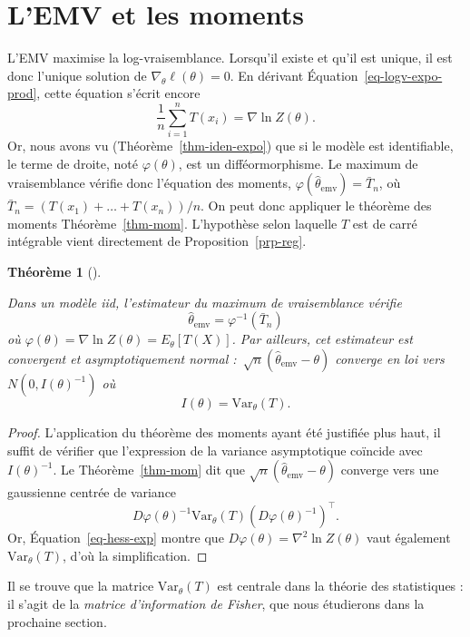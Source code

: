 \documentclass[
  10,
  letterpaper,
  DIV=11,
  numbers=noendperiod]{scrreport}
\newcommand{\emv}{\hat{\theta}_{\mathrm{emv}}}
\theoremstyle{plain}
\newtheorem{theorem}{Théorème}[chapter]
\theoremstyle{definition}
\theoremstyle{plain}
\theoremstyle{definition}
\theoremstyle{definition}
\theoremstyle{plain}
\theoremstyle{remark}
\begin{document}
\hypertarget{lemv-et-les-moments}{%
\section{L'EMV et les moments}\label{lemv-et-les-moments}}

L'EMV maximise la log-vraisemblance. Lorsqu'il existe et qu'il est
unique, il est donc l'unique solution de
\(\nabla_\theta \ell(\theta) = 0\). En dérivant
Équation~\ref{eq-logv-expo-prod}, cette équation s'écrit encore
\[\frac{1}{n}\sum_{i=1}^n T(x_i) = \nabla \ln Z(\theta).\] Or, nous
avons vu (Théorème~\ref{thm-iden-expo}) que si le modèle est
identifiable, le terme de droite, noté \(\varphi(\theta)\), est un
difféormorphisme. Le maximum de vraisemblance vérifie donc l'équation
des moments, \(\varphi(\emv) = \bar{T}_n\), où
\(\bar{T}_n = (T(x_1) + \dotsc + T(x_n))/n\). On peut donc appliquer le
théorème des moments Théorème~\ref{thm-mom}. L'hypothèse selon laquelle
\(T\) est de carré intégrable vient directement de
Proposition~\ref{prp-reg}.

\begin{theorem}[]\protect\hypertarget{thm-emv-mom}{}\label{thm-emv-mom}

Dans un modèle iid, l'estimateur du maximum de vraisemblance vérifie
\[\emv = \varphi^{-1}(\bar{T}_n)\] où
\(\varphi(\theta) = \nabla \ln Z(\theta)= E_\theta[T(X)]\). Par
ailleurs, cet estimateur est convergent et asymptotiquement normal
:~\(\sqrt{n}(\emv - \theta)\) converge en loi vers
\(N(0,I(\theta)^{-1})\) où \[I(\theta) = \mathrm{Var}_\theta(T).\]

\end{theorem}

\begin{proof}

L'application du théorème des moments ayant été justifiée plus haut, il
suffit de vérifier que l'expression de la variance asymptotique coïncide
avec \(I(\theta)^{-1}\). Le Théorème~\ref{thm-mom} dit que
\(\sqrt{n}(\emv - \theta)\) converge vers une gaussienne centrée de
variance
\[D\varphi(\theta)^{-1}\mathrm{Var}_\theta(T)(D\varphi(\theta)^{-1})^\top.
\] Or, Équation~\ref{eq-hess-exp} montre que
\(D\varphi(\theta) = \nabla^2 \ln Z(\theta)\) vaut également
\(\mathrm{Var}_\theta(T)\), d'où la simplification.

\end{proof}

Il se trouve que la matrice \(\mathrm{Var}_\theta(T)\) est centrale dans
la théorie des statistiques : il s'agit de la \emph{matrice
d'information de Fisher}, que nous étudierons dans la prochaine section.
\end{document}
